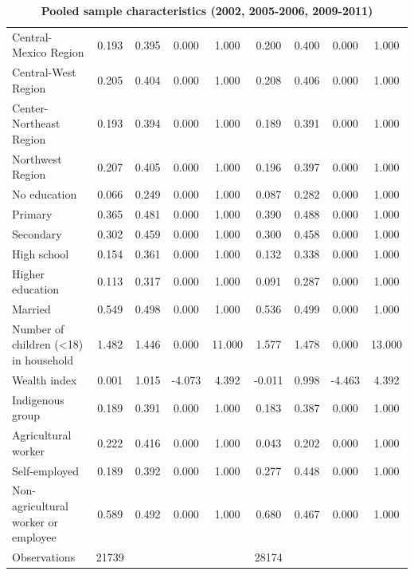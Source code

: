\documentclass[12pt,english,british]{article}
\begin{document}
\begin{table}[h]
\begin{center}
\begin{adjustbox}{max width=\textwidth}
{\begin{tabular}{l*{2}{cccc}}
Central-Mexico Region&       0.193&       0.395&       0.000&       1.000&       0.200&       0.400&       0.000&       1.000\\
Central-West Region &       0.205&       0.404&       0.000&       1.000&       0.208&       0.406&       0.000&       1.000\\
Center-Northeast Region&       0.193&       0.394&       0.000&       1.000&       0.189&       0.391&       0.000&       1.000\\
Northwest Region    &       0.207&       0.405&       0.000&       1.000&       0.196&       0.397&       0.000&       1.000\\
No education        &       0.066&       0.249&       0.000&       1.000&       0.087&       0.282&       0.000&       1.000\\
Primary             &       0.365&       0.481&       0.000&       1.000&       0.390&       0.488&       0.000&       1.000\\
Secondary           &       0.302&       0.459&       0.000&       1.000&       0.300&       0.458&       0.000&       1.000\\
High school         &       0.154&       0.361&       0.000&       1.000&       0.132&       0.338&       0.000&       1.000\\
Higher education    &       0.113&       0.317&       0.000&       1.000&       0.091&       0.287&       0.000&       1.000\\
Married             &       0.549&       0.498&       0.000&       1.000&       0.536&       0.499&       0.000&       1.000\\
Number of children (<18) in household&       1.482&       1.446&       0.000&      11.000&       1.577&       1.478&       0.000&      13.000\\
Wealth index        &       0.001&       1.015&      -4.073&       4.392&      -0.011&       0.998&      -4.463&       4.392\\
Indigenous group    &       0.189&       0.391&       0.000&       1.000&       0.183&       0.387&       0.000&       1.000\\
Agricultural worker &       0.222&       0.416&       0.000&       1.000&       0.043&       0.202&       0.000&       1.000\\
Self-employed       &       0.189&       0.392&       0.000&       1.000&       0.277&       0.448&       0.000&       1.000\\
Non-agricultural worker or employee&       0.589&       0.492&       0.000&       1.000&       0.680&       0.467&       0.000&       1.000\\
\midrule
Observations        &       21739&            &            &            &       28174&            &            &            \\
\bottomrule
\end{tabular}%
}
\end{adjustbox}
\end{center}
\caption{\label{tab:Pooled-sample-characteristics}\textbf{Pooled sample characteristics
(2002, 2005-2006, 2009-2011) }}
\end{table}
\end{document}
